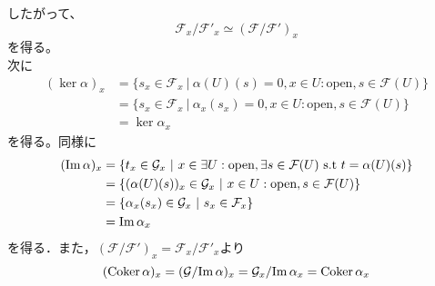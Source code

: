 {\begin{center}
\end{center}
したがって、
\begin{equation*}
  \mathcal{F}_{x}/\mathcal{F}'_{x} \simeq (\mathcal{F}/\mathcal{F}')_{x}
\end{equation*}
を得る。\\
次に
\begin{align*}
  (\ker \alpha)_{x}
    & = \{s_{x} \in \mathcal{F}_{x} \ |\ \alpha(U)(s) = 0,x\in U:\text{open},s\in \mathcal{F}(U) \}   \\
    & = \{s_{x} \in \mathcal{F}_{x} \ |\ \alpha_{x}(s_{x})=0,x\in U:\text{open},s\in \mathcal{F}(U)\} \\
    & = \ker \alpha_{x}
\end{align*}
を得る。同様に
\begin{align*}
  (\mathrm{Im}\, \alpha)_{x}
    & = \{t_{x} \in \mathcal{G}_{x} \ |\ x\in \exists U:\text{open}, \exists s\in \mathcal{F}(U)\ \text{s.t}\ t = \alpha(U)(s)\} \\
    & = \{(\alpha(U)(s))_{x} \in \mathcal{G}_{x} \ |\ x \in U:\text{open},s\in \mathcal{F}(U)\}                                  \\
    & = \{\alpha_{x}(s_{x}) \in \mathcal{G}_{x}\ |\ s_{x} \in \mathcal{F}_{x}\}                                                  \\
    & = \mathrm{Im}\, \alpha_{x}
\end{align*}
を得る．また，$(\mathcal{F}/\mathcal{F}')_{x} = \mathcal{F}_{x}/\mathcal{F}'_{x}$より
\begin{equation*}
  (\mathrm{Coker}\, \alpha)_{x} = (\mathcal{G}/\mathrm{Im}\, \alpha)_{x} = \mathcal{G}_{x}/\mathrm{Im}\, \alpha_{x} = \mathrm{Coker}\, \alpha_{x}
\end{equation*}
}


